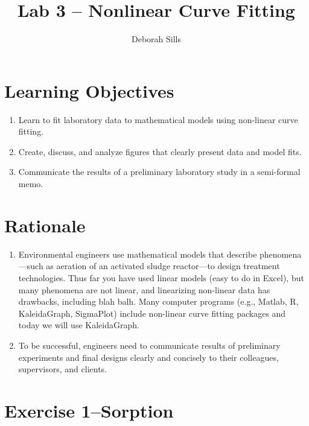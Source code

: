 \documentclass[12pt,letterpaper]{article}
\begin{document}
\setlength{\parindent}{0cm} 


\frenchspacing

\title {\textbf{Lab 3 -- Nonlinear Curve Fitting}} 

\author {Deborah Sills}
\maketitle
\section *{Learning Objectives}
\begin{enumerate}

\item Learn to fit laboratory data to mathematical models using non-linear curve fitting.\
\item Create, discuss, and analyze figures that clearly present data and model fits.\
\item Communicate the results of a preliminary laboratory study in a semi-formal memo.\ 
\end{enumerate}

\section *{Rationale}
\begin{enumerate}
\item Environmental engineers use mathematical models that describe phenomena---such as aeration of an activated sludge reactor---to design treatment technologies.  Thus far you have used linear models (easy to do in Excel), but many phenomena are not linear, and linearizing non-linear data has drawbacks, including blah balh.  Many computer programs (e.g., Matlab, R, KaleidaGraph, SigmaPlot) include non-linear curve fitting packages and today we will use KaleidaGraph.  
\item To be successful, engineers need to communicate results of preliminary experiments and final designs clearly and concisely to their colleagues, supervisors, and clients.
\end{enumerate}
 

\section *{Exercise 1--Sorption}

\end{document}
